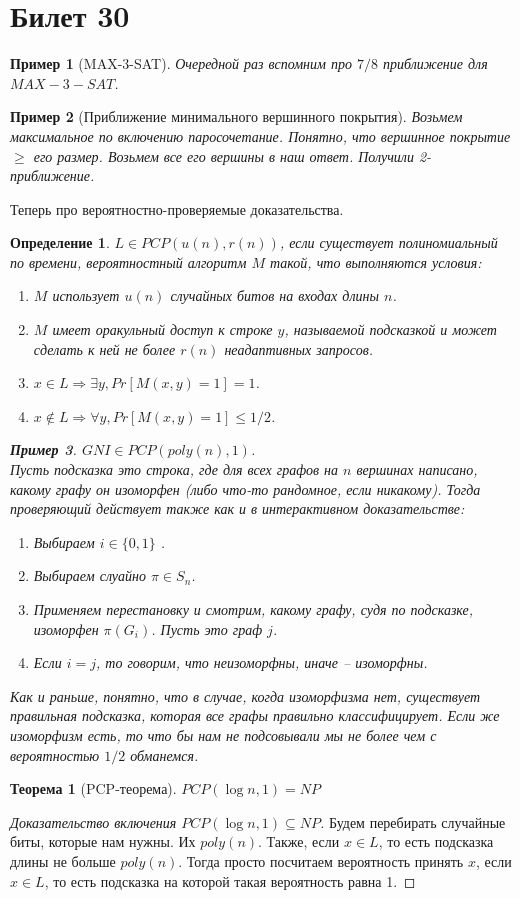 \documentclass[12pt, letterpaper]{article}
\newtheorem{theorem}{Теорема}[section]
\newtheorem{defi}{Определение}[section]
\newtheorem{sample}{Пример}[section]
\begin{document}
\section{Билет 30}
\begin{sample}[MAX-3-SAT]
Очередной раз вспомним про $7/8$ приближение для $MAX-3-SAT$.
\end{sample}
\begin{sample}[Приближение минимального вершинного покрытия]
Возьмем максимальное по включению паросочетание. Понятно, что вершинное покрытие $\geq $ его размер. Возьмем все его вершины в наш ответ. Получили 2-приближение.
\end{sample}
Теперь про вероятностно-проверяемые доказательства.
\begin{defi} $L \in PCP(u(n), r(n))$, если существует полиномиальный по времени, вероятностный алгоритм $M$ такой, что выполняются условия:
\begin{enumerate}
\item
$M$ использует $u(n)$ случайных битов на входах длины $n$. 
\item
$M$ имеет оракульный доступ к строке $y$, называемой подсказкой и может сделать к ней не более $r(n)$ неадаптивных запросов. 
\item
$x \in L \Longrightarrow \exists y, Pr[M(x,y)=1] = 1$.
\item
$x \notin L \Longrightarrow \forall y, Pr[M(x, y) = 1] \leq 1/2$.
\end{enumerate}
\begin{sample} 
$GNI \in PCP(poly(n), 1)$. \\
Пусть подсказка это строка, где для всех графов на $n$ вершинах написано, какому графу он изоморфен (либо что-то рандомное, если никакому). Тогда проверяющий действует также как и в интерактивном доказательстве:
\begin{enumerate}
\item Выбираем $i \in \{0, 1\}$ .
\item Выбираем слуайно $\pi \in S_n$.
\item Применяем перестановку и смотрим, какому графу, судя по подсказке, изоморфен $\pi(G_i)$. Пусть это граф $j$.
\item Если $i=j$, то говорим, что неизоморфны, иначе -- изоморфны.
\end{enumerate}
Как и раньше, понятно, что в случае, когда изоморфизма нет, существует правильная подсказка, которая все графы правильно классифицирует. Если же изоморфизм есть, то что бы нам не подсовывали мы не более чем с вероятностью $1/2$ обманемся.
\end{sample}
\end{defi}
\begin{theorem}[PCP-теорема]
$PCP(\log n, 1) = NP$
\end{theorem}
\begin{proof}[Доказательство включения $PCP(\log n, 1) \subseteq NP$]
Будем перебирать случайные биты, которые нам нужны. Их $poly(n)$. Также, если $x \in L$, то есть подсказка длины не больше $poly(n)$. Тогда просто посчитаем вероятность принять $x$, если $x \in L$, то есть подсказка на которой такая вероятность равна 1. 
\end{proof}
\end{document}
